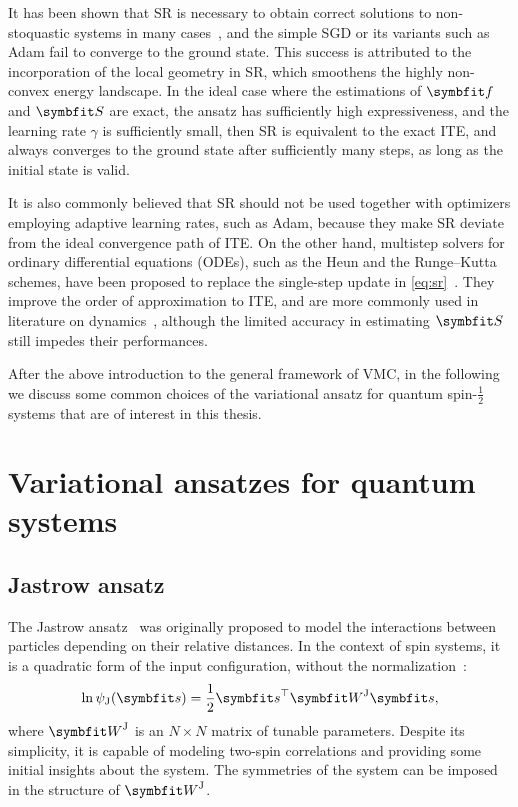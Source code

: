 It has been shown that SR is necessary to obtain correct solutions to non-stoquastic systems in many cases~\cite{carleo2017solving, choo2019two, bukov2021learning}, and the simple SGD or its variants such as Adam fail to converge to the ground state. This success is attributed to the incorporation of the local geometry in SR, which smoothens the highly non-convex energy landscape. In the ideal case where the estimations of $\vf$ and $\mS$ are exact, the ansatz has sufficiently high expressiveness, and the learning rate $\gamma$ is sufficiently small, then SR is equivalent to the exact ITE, and always converges to the ground state after sufficiently many steps, as long as the initial state is valid.

It is also commonly believed that SR should not be used together with optimizers employing adaptive learning rates, such as Adam, because they make SR deviate from the ideal convergence path of ITE. On the other hand, multistep solvers for ordinary differential equations (ODEs), such as the Heun and the Runge--Kutta schemes, have been proposed to replace the single-step update in \cref{eq:sr}~\cite{bukov2021learning}. They improve the order of approximation to ITE, and are more commonly used in literature on dynamics~\cite{schmitt2020quantum}, although the limited accuracy in estimating $\mS$ still impedes their performances.

After the above introduction to the general framework of VMC, in the following we discuss some common choices of the variational ansatz for quantum spin-$\frac{1}{2}$ systems that are of interest in this thesis.

\section{Variational ansatzes for quantum systems}

\subsection{Jastrow ansatz}

The Jastrow ansatz~\cite{jastrow1955many} was originally proposed to model the interactions between particles depending on their relative distances. In the context of spin systems, it is a quadratic form of the input configuration, without the normalization~\cite{huse1988simple}:
\begin{equation}
\ln \psi_\text{J}(\vs) = \frac{1}{2} \vs^\transpose \mW^\text{J} \vs,
\end{equation}
where $\mW^\text{J}$ is an $N \times N$ matrix of tunable parameters. Despite its simplicity, it is capable of modeling two-spin correlations and providing some initial insights about the system. The symmetries of the system can be imposed in the structure of $\mW^\text{J}$.

